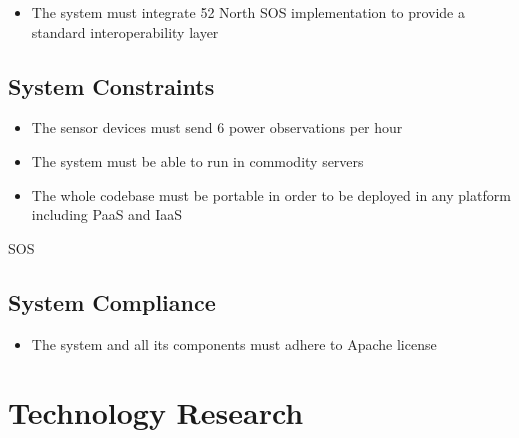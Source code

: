 \begin{itemize}
	\item The system must integrate 52 North SOS implementation to provide a standard interoperability layer
\end{itemize}

\subsection{System Constraints}

\begin{itemize}
	\item The sensor devices must send 6 power observations per hour
	\item The system must be able to run in commodity servers 
	\item The whole codebase must be portable in order to be deployed in any platform including PaaS and IaaS
\end{itemize}

SOS

\subsection{System Compliance}

\begin{itemize}
	\item The system and all its components must adhere to Apache license
\end{itemize}


\section{Technology Research}




